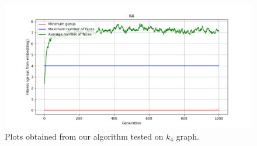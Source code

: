 \documentclass{article}
\begin{document}
\begin{figure}[!tbh]
    \centering
    \label{tests2}
    \includegraphics[scale = 0.5]{k4.png}
    \caption{Plots obtained from our algorithm tested on $k_4$ graph.}
\end{figure}
\end{document}
